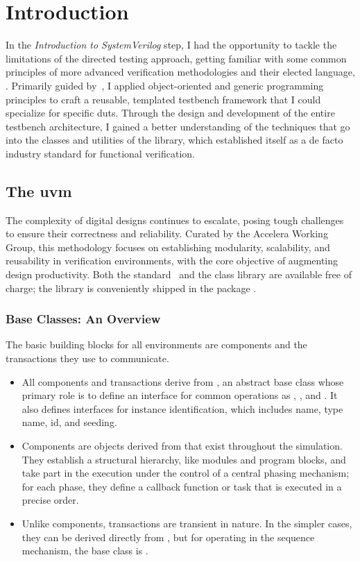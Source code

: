 \section{Introduction}
In the \emph{Introduction to SystemVerilog} step, I had the opportunity to tackle the limitations of the directed testing approach, getting familiar with some common principles of more advanced verification methodologies and their elected language, \sv. Primarily guided by~\cite{spear:svfe}, I applied object-oriented and generic programming principles to craft a reusable, templated testbench framework that I could specialize for specific \acs{dut}s. Through the design and development of the entire testbench architecture, I gained a better understanding of the techniques that go into the classes and utilities of the \uvm library, which established itself as a de facto industry standard for functional verification.

\subsection{The \acl{uvm}}
The complexity of digital designs continues to escalate, posing tough challenges to ensure their correctness and reliability. Curated by the Accelera \uvm Working Group, this methodology focuses on establishing modularity, scalability, and reusability in verification environments, with the core objective of augmenting design productivity.
Both the standard~\cite{IEEE:1800.22020} and the class library are available free of charge; the library is conveniently shipped in the package .

\subsubsection{Base Classes: An Overview}
The basic building blocks for all environments are components and the transactions they use to communicate.
\begin{itemize}
    \item All components and transactions derive from , an abstract base class whose primary role is to define an interface for common operations as , , and . It also defines interfaces for instance identification, which includes name, type name, id, and seeding.
    \item Components are objects derived from  that exist throughout the simulation. They establish a structural hierarchy, like modules and program blocks, and take part in the execution under the control of a central phasing mechanism; for each phase, they define a callback function or task that is executed in a precise order.
    \item Unlike components, transactions are transient in nature. In the simpler cases, they can be derived directly from , but for operating in the sequence mechanism, the base class is .
\end{itemize}

